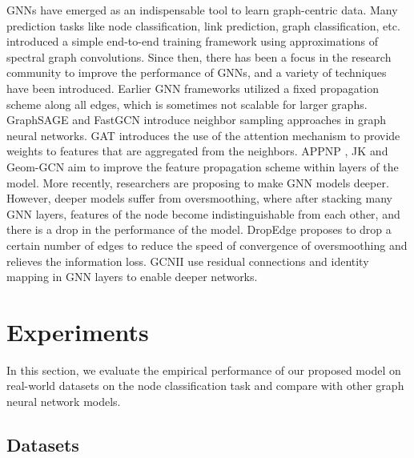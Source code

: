 \documentclass[sigconf,natbib=false]{acmart}
\begin{document}
GNNs have emerged as an indispensable tool to learn graph-centric data. Many prediction tasks like node classification, link prediction, graph classification, etc. \cite{defferrard_convolutional_2016}\cite{kipf_semi-supervised_2017} introduced a simple end-to-end training framework using approximations of spectral graph convolutions. Since then, there has been a focus in the research community to improve the performance of GNNs, and a variety of techniques have been introduced. Earlier GNN frameworks utilized a fixed propagation scheme along all edges, which is sometimes not scalable for larger graphs. GraphSAGE\cite{hamilton_inductive_2017} and FastGCN\cite{chen_fastgcn:_2018} introduce neighbor sampling approaches in graph neural networks. GAT \cite{velickovic_graph_2017} introduces the use of the attention mechanism to provide weights to features that are aggregated from the neighbors. APPNP \cite{klicpera_predict_2018}, JK \cite{xu_representation_2018} and Geom-GCN \cite{pei_geom-gcn_2020} aim to improve the feature propagation scheme within layers of the model. More recently, researchers are proposing to make GNN models deeper. However, deeper models suffer from oversmoothing, where after stacking many GNN layers, features of the node become indistinguishable from each other, and there is a drop in the performance of the model. DropEdge \cite{rong_dropedge_2020} proposes to drop a certain number of edges to reduce the speed of convergence of oversmoothing and relieves the information loss. GCNII \cite{chen_simple_2020} use residual connections and identity mapping in GNN layers to enable deeper networks. 

\section{Experiments}
\label{experiments}
In this section, we evaluate the empirical performance of our proposed model on real-world datasets on the node classification task
and compare with other graph neural network models.

\subsection{Datasets}
\end{document}

